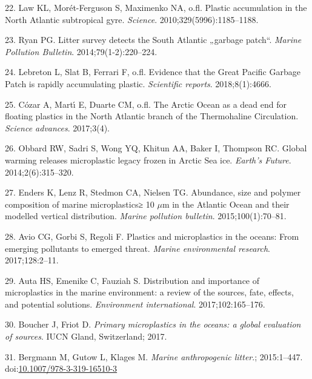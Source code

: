 \documentclass[icelandic,]{book}
\begin{document}
\leavevmode\hypertarget{ref-law2010plastic}{}%
22. Law KL, Morét-Ferguson S, Maximenko NA, o.fl. Plastic accumulation in the North Atlantic subtropical gyre. \emph{Science}. 2010;329(5996):1185--1188.

\leavevmode\hypertarget{ref-ryan2014litter}{}%
23. Ryan PG. Litter survey detects the South Atlantic „garbage patch``. \emph{Marine Pollution Bulletin}. 2014;79(1-2):220--224.

\leavevmode\hypertarget{ref-lebreton2018evidence}{}%
24. Lebreton L, Slat B, Ferrari F, o.fl. Evidence that the Great Pacific Garbage Patch is rapidly accumulating plastic. \emph{Scientific reports}. 2018;8(1):4666.

\leavevmode\hypertarget{ref-cozar2017arctic}{}%
25. Cózar A, Martı́ E, Duarte CM, o.fl. The Arctic Ocean as a dead end for floating plastics in the North Atlantic branch of the Thermohaline Circulation. \emph{Science advances}. 2017;3(4).

\leavevmode\hypertarget{ref-obbard2014global}{}%
26. Obbard RW, Sadri S, Wong YQ, Khitun AA, Baker I, Thompson RC. Global warming releases microplastic legacy frozen in Arctic Sea ice. \emph{Earth's Future}. 2014;2(6):315--320.

\leavevmode\hypertarget{ref-enders2015abundance}{}%
27. Enders K, Lenz R, Stedmon CA, Nielsen TG. Abundance, size and polymer composition of marine microplastics≥ 10 \(\mu\)m in the Atlantic Ocean and their modelled vertical distribution. \emph{Marine pollution bulletin}. 2015;100(1):70--81.

\leavevmode\hypertarget{ref-avio2017plastics}{}%
28. Avio CG, Gorbi S, Regoli F. Plastics and microplastics in the oceans: From emerging pollutants to emerged threat. \emph{Marine environmental research}. 2017;128:2--11.

\leavevmode\hypertarget{ref-auta2017distribution}{}%
29. Auta HS, Emenike C, Fauziah S. Distribution and importance of microplastics in the marine environment: a review of the sources, fate, effects, and potential solutions. \emph{Environment international}. 2017;102:165--176.

\leavevmode\hypertarget{ref-boucher2017primary}{}%
30. Boucher J, Friot D. \emph{Primary microplastics in the oceans: a global evaluation of sources}. IUCN Gland, Switzerland; 2017.

\leavevmode\hypertarget{ref-Bergmann2015}{}%
31. Bergmann M, Gutow L, Klages M. \emph{Marine anthropogenic litter}.; 2015:1--447. doi:\href{https://doi.org/10.1007/978-3-319-16510-3}{10.1007/978-3-319-16510-3}
\end{document}
